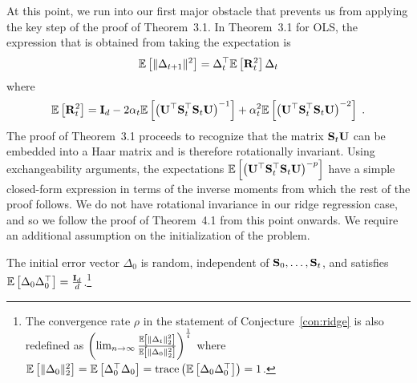 At this point, we run into our first major obstacle that prevents us from applying the key step of the proof of Theorem~3.1. In Theorem~3.1 for OLS, the expression that is obtained from taking the expectation is
\[
\mathbb{E}\left[\|\Delta_{t+1}\|^2\right] = \Delta_t^\top\mathbb{E}\left[\mathbf{R}_t^2\right]\Delta_t
\]
where
\[
\mathbb{E}\left[\mathbf{R}_t^2\right] = \mathbf{I}_d - 2\alpha_t\mathbb{E}\left[\left(\mathbf{U}^\top\mathbf{S}_t^\top\mathbf{S}_t\mathbf{U}\right)^{-1}\right] + \alpha_t^2\mathbb{E}\left[\left(\mathbf{U}^\top\mathbf{S}_t^\top\mathbf{S}_t\mathbf{U}\right)^{-2}\right] \;.
\]
The proof of Theorem~3.1 proceeds to recognize that the matrix $\mathbf{S}_t\mathbf{U}$ can be embedded into a Haar matrix and is therefore rotationally invariant. Using exchangeability arguments, the expectations $\mathbb{E}\left[\left(\mathbf{U}^\top\mathbf{S}_t^\top\mathbf{S}_t\mathbf{U}\right)^{-p}\right]$ have a simple closed-form expression in terms of the inverse moments from which the rest of the proof follows. We do not have rotational invariance in our ridge regression case, and so we follow the proof of Theorem~4.1 from this point onwards. We require an additional assumption on the initialization of the problem.

\begin{assumption} \label{asp:initialization}
The initial error vector $\Delta_0$ is random, independent of $\mathbf{S}_0,\ldots,\mathbf{S}_t$, and satisfies $\mathbb{E}\left[\Delta_0\Delta_0^\top\right]=\frac{\mathbf{I}_d}{d}$.\footnote{The convergence rate $\rho$ in the statement of Conjecture~\ref{con:ridge} is also redefined as $\left(\lim_{n\rightarrow\infty}\frac{\mathbb{E}\left[\|\Delta_t\|_2^2\right]}{\mathbb{E}\left[\|\Delta_0\|_2^2\right]}\right)^\frac{1}{t}$ where $\mathbb{E}\left[\|\Delta_0\|_2^2\right]=\mathbb{E}\left[\Delta_0^\top\Delta_0\right]=\mathrm{trace}\left(\mathbb{E}\left[\Delta_0\Delta_0^\top\right]\right)=1$.}
\end{assumption}

